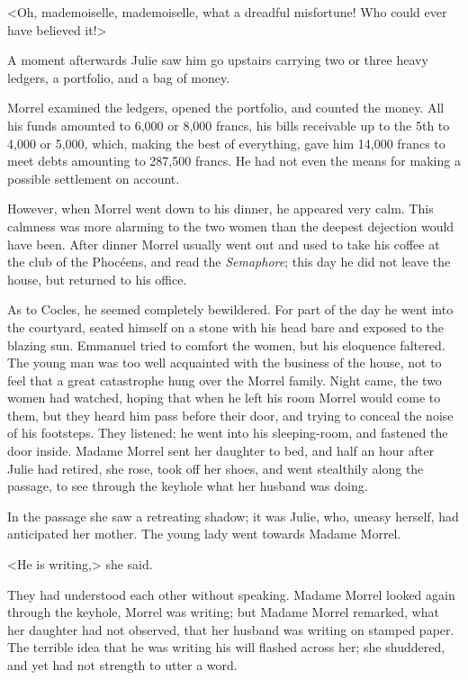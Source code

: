  <Oh, mademoiselle, mademoiselle, what a dreadful misfortune! Who could ever have believed it!> 

 A moment afterwards Julie saw him go upstairs carrying two or three heavy ledgers, a portfolio, and a bag of money. 

 Morrel examined the ledgers, opened the portfolio, and counted the money. All his funds amounted to 6,000 or 8,000 francs, his bills receivable up to the 5th to 4,000 or 5,000, which, making the best of everything, gave him 14,000 francs to meet debts amounting to 287,500 francs. He had not even the means for making a possible settlement on account. 

 However, when Morrel went down to his dinner, he appeared very calm. This calmness was more alarming to the two women than the deepest dejection would have been. After dinner Morrel usually went out and used to take his coffee at the club of the Phocéens, and read the \textit{Semaphore}; this day he did not leave the house, but returned to his office. 

 As to Cocles, he seemed completely bewildered. For part of the day he went into the courtyard, seated himself on a stone with his head bare and exposed to the blazing sun. Emmanuel tried to comfort the women, but his eloquence faltered. The young man was too well acquainted with the business of the house, not to feel that a great catastrophe hung over the Morrel family. Night came, the two women had watched, hoping that when he left his room Morrel would come to them, but they heard him pass before their door, and trying to conceal the noise of his footsteps. They listened; he went into his sleeping-room, and fastened the door inside. Madame Morrel sent her daughter to bed, and half an hour after Julie had retired, she rose, took off her shoes, and went stealthily along the passage, to see through the keyhole what her husband was doing. 

 In the passage she saw a retreating shadow; it was Julie, who, uneasy herself, had anticipated her mother. The young lady went towards Madame Morrel. 

 <He is writing,> she said. 

 They had understood each other without speaking. Madame Morrel looked again through the keyhole, Morrel was writing; but Madame Morrel remarked, what her daughter had not observed, that her husband was writing on stamped paper. The terrible idea that he was writing his will flashed across her; she shuddered, and yet had not strength to utter a word. 

